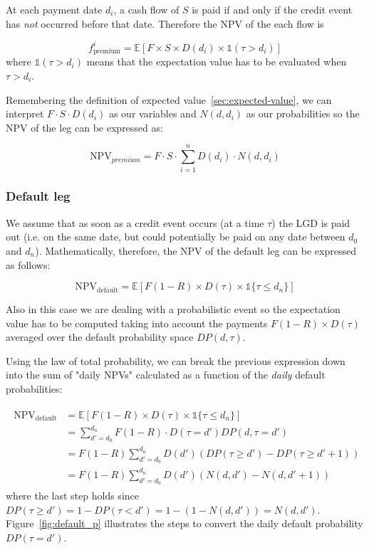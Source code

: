 At each payment date \(d_i\), a cash flow of \(S\) is paid if and only if the
credit event has \emph{not} occurred before that date. Therefore the NPV of the
each flow is

\begin{equation}
f_{\textrm{premium}}^i = \mathbb{E}\left[F\times S \times D(d_i) \times \mathbb{1}(\tau > d_i) \right]
\end{equation}
where \(\mathbb{1}(\tau > d_i)\) means that the expectation value has to
be evaluated when \(\tau > d_i\). 

Remembering the definition of expected value~\ref{sec:expected-value}, we can interpret 
\(F\cdot S\cdot D(d_i)\) as our variables and \(N(d, d_i)\) as our probabilities so the NPV of the leg can be expressed as:

\begin{equation}
	\textrm{NPV}_{premium} = F\cdot S \cdot \sum_{i=1}^{n} D(d_i) \cdot N(d, d_i)
\end{equation}

\subsubsection{Default leg}\label{default-leg}

We assume that as soon as a credit event occurs (at a time $\tau$) the LGD is paid out (i.e. on the same date, but could potentially be paid on any date between \(d_0\) and \(d_n\)). Mathematically, therefore, the NPV of the default leg can be expressed as follows:

\begin{equation}
\mathrm{NPV_{default}} =\mathbb{E}[F(1-R) \times D(\tau) \times \mathbb{1} \{\tau \leq d_n\} ]
\end{equation}

Also in this case we are dealing with a probabilistic event so the expectation value has to be computed taking into account the payments $F(1-R)\times D(\tau)$ averaged over the default probability space $DP(d, \tau)$. 

Using the law of total probability, we can break the previous expression down into the sum
of "daily NPVs" calculated as a function of the \emph{daily} default
probabilities:

\begin{align}
\begin{split}
\mathrm{NPV_{default}} &= \mathbb{E}[F(1-R) \times D(\tau) \times \mathbb{1}\{\tau \leq d_n\} ] \\
&= \sum_{d'=d_0}^{d_n} F(1-R) \cdot D(\tau = d') DP(d, \tau = d') \\
&= F(1-R) \sum_{d'=d_0}^{d_n} D(d') \left(DP(\tau \geq d') - DP( \tau \geq d'+1) \right) \\
&= F(1-R) \sum_{d'=d_0}^{d_n} D(d') \left( N(d, d') - N(d, d'+1) \right)
\end{split}
\end{align}
where the last step holds since $DP(\tau\geq d') = 1 - DP(\tau < d') = 1 - (1-N(d, d')) = N(d, d')$. 
Figure~\ref{fig:default_p} illustrates the steps to convert the daily default probability $DP(\tau=d')$.

